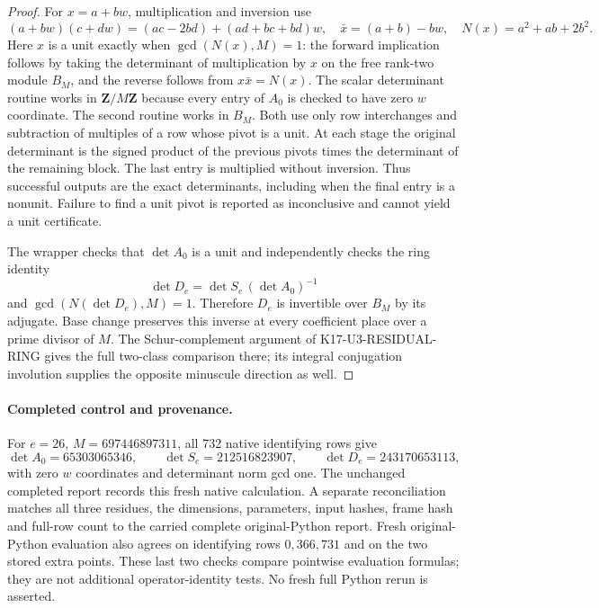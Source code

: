 \begin{proof}
For $x=a+bw$, multiplication and inversion use
\[
 (a+bw)(c+dw)=(ac-2bd)+(ad+bc+bd)w,
 \quad \bar x=(a+b)-bw,
 \quad N(x)=a^2+ab+2b^2.
\]
Here $x$ is a unit exactly when $\gcd(N(x),M)=1$: the forward
implication follows by taking the determinant of multiplication
by $x$ on the free rank-two module $B_M$, and the reverse follows
from $x\bar x=N(x)$.  The scalar determinant routine works in
$\mathbf Z/M\mathbf Z$ because every entry of $A_0$ is checked
to have zero $w$ coordinate.  The second routine works in $B_M$.
Both use only row interchanges and subtraction of multiples of
a row whose pivot is a unit.  At each stage the original
determinant is the signed product of the previous pivots times
the determinant of the remaining block.  The last entry is
multiplied without inversion.  Thus successful outputs are the
exact determinants, including when the final entry is a nonunit.
Failure to find a unit pivot is reported as inconclusive and
cannot yield a unit certificate.

The wrapper checks that $\det A_0$ is a unit and independently
checks the ring identity
\[
 \det D_e=\det S_e\,(\det A_0)^{-1}
\]
and $\gcd(N(\det D_e),M)=1$.  Therefore $D_e$ is invertible
over $B_M$ by its adjugate.  Base change preserves this inverse
at every coefficient place over a prime divisor of $M$.
The Schur-complement argument of K17-U3-RESIDUAL-RING gives the
full two-class comparison there; its integral conjugation
involution supplies the opposite minuscule direction as well.
\end{proof}

\paragraph{Completed control and provenance.}
For $e=26$, $M=697446897311$, all 732 native identifying rows
give
\[
 \det A_0=65303065346,\qquad
 \det S_e=212516823907,\qquad
 \det D_e=243170653113,
\]
with zero $w$ coordinates and determinant norm gcd one.
The unchanged completed report
 records this fresh
native calculation.  A separate reconciliation
 matches all three
residues, the dimensions, parameters, input hashes, frame hash
and full-row count to the carried complete original-Python
 report.
Fresh original-Python evaluation also agrees on identifying
rows $0,366,731$ and on the two stored extra points.  These
last two checks compare pointwise evaluation formulas; they
are not additional operator-identity tests.  No fresh full
Python rerun is asserted.

